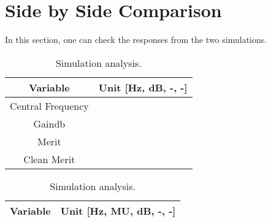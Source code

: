 \section{Side by Side Comparison}

In this section, one can check the responses from the two simulations.

\begin{table}[H]
    \begin{minipage}{.5\textwidth}
    \centering
    \vspace{3mm}
    \begin{table}[H]
    \centering
    \begin{tabular}{|c|c|}
    	\hline
        Variable & Unit [Hz, dB, -, -]\\ 
        \hline
        Central Frequency & \\
        \hline
        Gaindb & \\
        \hline
        Merit & \\
        \hline
        Clean Merit & \\
        \hline
    \end{tabular}
	\end{table}
    \caption{Theoretical analysis.}
    \end{minipage}
    \begin{minipage}{.5\textwidth}
        \begin{table}[H]
    \centering
    \begin{tabular}{|c|c|}
    	\hline
    	Variable & Unit [Hz, MU, dB, -, -]\\ 
    	\hline
         
    \end{tabular}
	\end{table}
	\caption{Simulation analysis.} 
    \end{minipage}
\end{table}


